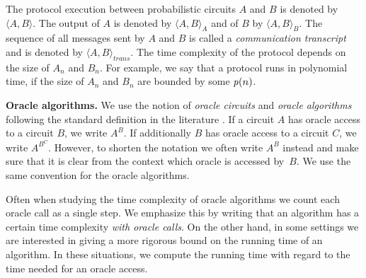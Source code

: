 The protocol execution between probabilistic circuits $A$ and $B$ is denoted by $\langle A, B \rangle$.
The output of $A$ is denoted by $\langle A, B \rangle_A$ and of $B$ by $\langle A, B \rangle_B$.
The sequence of all messages sent by $A$ and $B$ is called a \textit{communication transcript} and
is denoted by $\langle A, B \rangle_{\mathit{trans}}$.
The time complexity of the protocol depends on the size of $A_n$ and $B_n$.
For example, we say that a protocol runs in polynomial time, if the size of $A_n$ and $B_n$ are bounded by some $\operatorname{\mathit{p}}(n)$.

\textbf{Oracle algorithms.}
We use the notion of \textit{oracle circuits} and \textit{oracle algorithms} following the standard definition in the literature \cite{Goldreich:2004:FCV:975541, Arora:2009:CCM:1540612}.
If a circuit $A$ has oracle access to a circuit $B$, we write $A^B$. If additionally $B$ has oracle access to a circuit $C$,
we write $A^{B^C}$. However, to shorten the notation we often write $A^{B}$ instead and make sure that it is clear from
the context which oracle is accessed by~$B$. We use the same convention for the oracle algorithms.

Often when studying the time complexity of oracle algorithms we count each oracle call as a single step.
We emphasize this by writing that an algorithm has a certain time complexity \textit{with oracle calls}.
On the other hand, in some settings we are interested in giving a more rigorous bound on the running time of an algorithm.
In these situations, we compute the running time with regard to the time needed for an oracle access.



